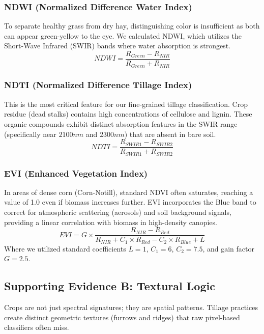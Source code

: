 \documentclass[conference]{IEEEtran}
\begin{document}
\subsubsection{NDWI (Normalized Difference Water Index)}
To separate healthy grass from dry hay, distinguishing color is insufficient as both can appear green-yellow to the eye. We calculated NDWI, which utilizes the Short-Wave Infrared (SWIR) bands where water absorption is strongest.
\begin{equation}
    NDWI = \frac{R_{Green} - R_{NIR}}{R_{Green} + R_{NIR}}
\end{equation}

\subsubsection{NDTI (Normalized Difference Tillage Index)}
This is the most critical feature for our fine-grained tillage classification. Crop residue (dead stalks) contains high concentrations of cellulose and lignin. These organic compounds exhibit distinct absorption features in the SWIR range (specifically near $2100nm$ and $2300nm$) that are absent in bare soil.
\begin{equation}
    NDTI = \frac{R_{SWIR1} - R_{SWIR2}}{R_{SWIR1} + R_{SWIR2}}
\end{equation}

\subsubsection{EVI (Enhanced Vegetation Index)}
In areas of dense corn (Corn-Notill), standard NDVI often saturates, reaching a value of 1.0 even if biomass increases further. EVI incorporates the Blue band to correct for atmospheric scattering (aerosols) and soil background signals, providing a linear correlation with biomass in high-density canopies.
\begin{equation}
    EVI = G \times \frac{R_{NIR} - R_{Red}}{R_{NIR} + C_1 \times R_{Red} - C_2 \times R_{Blue} + L}
\end{equation}
Where we utilized standard coefficients $L=1$, $C_1=6$, $C_2=7.5$, and gain factor $G=2.5$.

\subsection{Supporting Evidence B: Textural Logic}
Crops are not just spectral signatures; they are spatial patterns. Tillage practices create distinct geometric textures (furrows and ridges) that raw pixel-based classifiers often miss.
\end{document}
